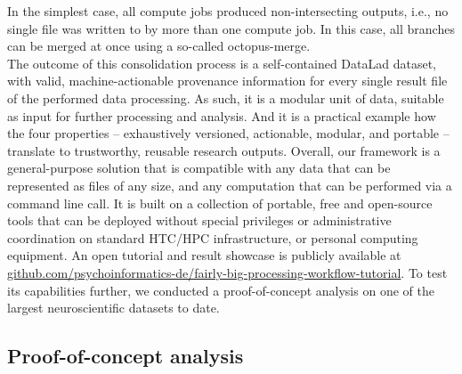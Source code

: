 In the simplest case, all compute jobs produced non-intersecting outputs, i.e., no single file was written to by more than one compute job.
In this case, all branches can be merged at once using a so-called octopus-merge.\\
The outcome of this consolidation process is a self-contained DataLad dataset, with valid, machine-actionable provenance information for every single result file of the performed data processing.
As such, it is a modular unit of data, suitable as input for further processing and analysis.
And it is a practical example how the four properties -- exhaustively versioned, actionable, modular, and portable -- translate to trustworthy, reusable research outputs.
Overall, our framework is a general-purpose solution that is compatible with any data that can be represented as files of any size, and any computation that can be performed via a command line call. It is built on a collection of portable, free and open-source tools that can be deployed without special privileges or administrative coordination on standard \gls{HTC}/\gls{HPC} infrastructure, or personal computing equipment.
An open tutorial and result showcase is publicly available at \url{github.com/psychoinformatics-de/fairly-big-processing-workflow-tutorial}.
To test its capabilities further, we conducted a proof-of-concept analysis on one of the largest neuroscientific datasets to date.




\subsection{Proof-of-concept analysis}

